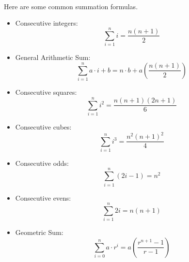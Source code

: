 
\begin{note*}
Here are some common summation formulas.
\begin{itemize}
    \item Consecutive integers:
        \begin{equation}\sum_{i=1}^n i=\frac{n(n+1)}{2}\label{eq:consecutive}\end{equation}
    \item General Arithmetic Sum:
        \begin{equation}\sum_{i=1}^n a\cdot i+b=n\cdot b+a\left(\frac{n(n+1)}{2}\right)\label{eq:arithmetic}\end{equation}        
    \item Consecutive squares:
        \begin{equation}\sum_{i=1}^n i^2=\frac{n(n+1)(2n+1)}{6}\label{eq:square}\end{equation}
    \item Consecutive cubes:
        \begin{equation}\sum_{i=1}^n i^3=\frac{n^2(n+1)^2}{4}\label{eq:cube}\end{equation}
    \item Consecutive odds:
        \begin{equation}\sum_{i=1}^n (2i-1)=n^2\label{eq:odd}\end{equation}
    \item Consecutive evens:
        \begin{equation}\sum_{i=1}^n 2i=n(n+1)\label{eq:even}\end{equation}
    \item Geometric Sum:
        \begin{equation}\sum_{i=0}^n a\cdot r^i = a\left(\frac{r^{n+1}-1}{r-1}\right)\label{eq:geometric}\end{equation}
\end{itemize}
\end{note*}

\clearpage

